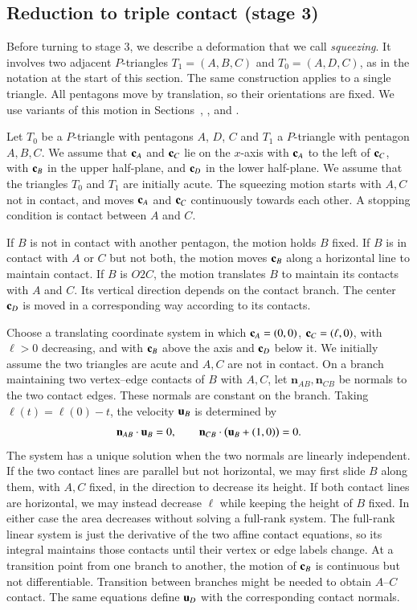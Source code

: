 \subsection{Reduction to triple contact (stage 3)}

Before turning to stage 3, we describe a deformation that we
call \emph{squeezing}.  It involves two adjacent $P$-triangles
$T_1=(A,B,C)$ and $T_0=(A,D,C)$, as in the notation at the
start of this section.  The same construction applies to a single
triangle.  All pentagons move by translation, so their orientations
are fixed.  We use variants of this motion in
Sections~, , and
.

Let $T_0$ be a $P$-triangle with pentagons $A$, $D$, $C$ and $T_1$ a
$P$-triangle with pentagon $A,B,C$.  We assume that ${\mathbf c}_A$ and ${\mathbf c}_C$
lie on the $x$-axis with ${\mathbf c}_A$ to the left of ${\mathbf c}_C$, with ${\mathbf c}_B$ in
the upper half-plane, and ${\mathbf c}_D$ in the lower half-plane.  We assume
that the triangles $T_0$ and $T_1$ are initially acute.  The squeezing
motion starts with $A,C$ not in contact, and moves ${\mathbf c}_A$ and
${\mathbf c}_C$ continuously towards each other.  A stopping condition is
contact between $A$ and $C$.

If $B$ is not in contact with another pentagon, the motion holds $B$ fixed.
If $B$ is in contact with $A$ or $C$ but not both, the motion
moves ${\mathbf c}_B$ along a horizontal line to maintain contact.
If $B$ is $O2C$, the motion translates $B$ to maintain its contacts
with $A$ and $C$. Its vertical direction depends on the contact branch.
The center ${\mathbf c}_D$ is moved in a corresponding way according to its contacts.

Choose a translating coordinate system in which
${\mathbf c}_A=(0,0)$, ${\mathbf c}_C=(\ell,0)$, with $\ell>0$ decreasing,
and with ${\mathbf c}_B$ above the axis and ${\mathbf c}_D$ below it.  We
initially assume the two triangles are acute and $A,C$ are not
in contact.  On a branch maintaining two vertex--edge contacts of
$B$ with $A,C$, let $\mathbf{n}_{AB},\mathbf{n}_{CB}$ be normals to the two
contact edges.  These normals are constant on the branch.  Taking
$\ell(t)=\ell(0)-t$, the velocity ${\mathbf u}_B$ is determined by
\[
\mathbf{n}_{AB}\cdot {\mathbf u}_B=0,\qquad
\mathbf{n}_{CB}\cdot\bigl({\mathbf u}_B+(1,0)\bigr)=0.
\]
The system has a unique solution when the two normals are linearly
independent.  If the two contact lines are parallel but not horizontal, we may
first slide $B$ along them, with $A,C$ fixed, in the direction to
decrease its height. If both contact lines are horizontal, we may
instead decrease $\ell$ while keeping the height of $B$ fixed. In
either case the area decreases without solving a full-rank system.
The full-rank linear system is just the derivative of the two affine contact
equations, so its integral maintains those contacts until their
vertex or edge labels change.  At a transition point from one branch to
another, the motion of ${\mathbf c}_B$ is continuous but not differentiable.
Transition between branches might be needed to obtain $A$--$C$ contact.
The same equations define ${\mathbf u}_D$
with the corresponding contact normals.

